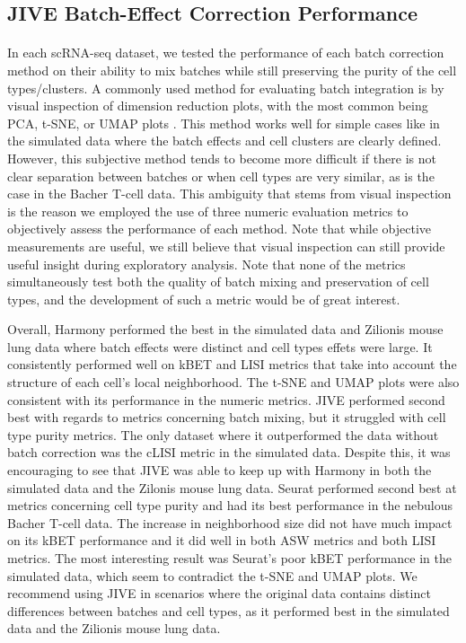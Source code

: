 \documentclass[
12pt, %
letterpaper, %
oneside, %
headinclude,footinclude, %
BCOR5mm, %
]{scrartcl}
\begin{document}

\subsection{JIVE Batch-Effect Correction Performance}

\paragraph*{}
In each scRNA-seq dataset, we tested the performance of each batch correction method on their ability to mix batches while still preserving the purity of the cell types/clusters. A commonly used method for evaluating batch integration is by visual inspection of dimension reduction plots, with the most common being PCA, t-SNE, or UMAP plots \citep{tran2020benchmark}. This method works well for simple cases like in the simulated data where the batch effects and cell clusters are clearly defined. However, this subjective method tends to become more difficult if there is not clear separation between batches or when cell types are very similar, as is the case in the Bacher T-cell data. This ambiguity that stems from visual inspection is the reason we employed the use of three numeric evaluation metrics to objectively assess the performance of each method. Note that while objective measurements are useful, we still believe that visual inspection can still provide useful insight during exploratory analysis. Note that none of the metrics simultaneously test both the quality of batch mixing and preservation of cell types, and the development of such a metric would be of great interest.

Overall, Harmony performed the best in the simulated data and Zilionis mouse lung data where batch effects were distinct and cell types effets were large. It consistently performed well on kBET and LISI metrics that take into account the structure of each cell's local neighborhood. The t-SNE and UMAP plots were also consistent with its performance in the numeric metrics. JIVE performed second best with regards to metrics concerning batch mixing, but it struggled with cell type purity metrics. The only dataset where it outperformed the data without batch correction was the cLISI metric in the simulated data. Despite this, it was encouraging to see that JIVE was able to keep up with Harmony in both the simulated data and the Zilonis mouse lung data. Seurat performed second best at metrics concerning cell type purity and had its best performance in the nebulous Bacher T-cell data. The increase in neighborhood size did not have much impact on its kBET performance and it did well in both ASW metrics and both LISI metrics. The most interesting result was Seurat's poor kBET performance in the simulated data, which seem to contradict the t-SNE and UMAP plots.
We recommend using JIVE in scenarios where the original data contains distinct differences between batches and cell types, as it performed best in the simulated data and the Zilionis mouse lung data.
\end{document}
